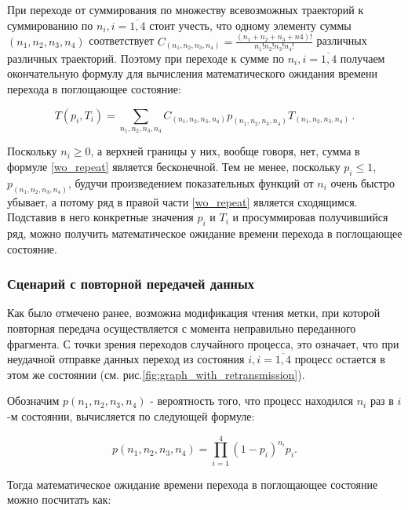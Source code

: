 \documentclass[12pt]{article}
\theoremstyle{definition}
\begin{document}
При переходе от суммирования по множеству всевозможных траекторий к суммированию по $n_i, i = \overline{1,4}$ стоит учесть, что одному элементу суммы $(n_1,n_2,n_3,n_4)$ соответствует $C_{(n_1,n_2,n_3,n_4)} = \frac{(n_1+n_2+n_3+n4)!}{n_1!n_2!n_3!n_4!}$ различных различных траекторий. Поэтому при переходе к сумме по $n_i, i = \overline{1,4}$ получаем окончательную формулу для вычисления математического ожидания времени перехода в поглощающее состояние: 


\begin{equation}
\label{wo_repeat}
    T(p_i,T_i) = \sum_{n_1,n_2,n_3,n_4} C_{(n_1,n_2,n_3,n_4)} p_{(n_1,n_2,n_3,n_4)} T_{(n_1,n_2,n_3,n_4)}\,.
\end{equation}

Поскольку $n_i\geq0$, а верхней границы у них, вообще говоря, нет, сумма в формуле \eqref{wo_repeat} является бесконечной. Тем не менее, поскольку $p_i\leq1$, $p_{(n_1,n_2,n_3,n_4)}$, будучи произведением показательных функций от $n_i$ очень быстро убывает, а потому ряд в правой части \eqref{wo_repeat} является сходящимся. Подставив в него конкретные значения $p_i$ и $T_i$ и просуммировав получившийся ряд, можно получить математическое ожидание времени перехода в поглощающее состояние.

\subsubsection{Сценарий с повторной передачей данных}

Как было отмечено ранее, возможна модификация чтения метки, при которой повторная передача осуществляется с момента неправильно переданного фрагмента. С точки зрения переходов случайного процесса, это означает, что при неудачной отправке данных переход из состояния $i, i=\overline{1,4}$ процесс остается в этом же состоянии (см. рис.\ref{fig:graph_with_retransmission}).

Обозначим $p(n_1,n_2,n_3,n_4)$ - вероятность того, что процесс находился $n_i$ раз в $i$-м состоянии, вычисляется по следующей формуле:

\begin{equation}
    p(n_1,n_2,n_3,n_4) = \prod_{i=1}^{4} (1-p_i)^{n_i}p_i.
\end{equation}

Тогда математическое ожидание времени перехода в поглощающее состояние можно посчитать как:
\end{document}
